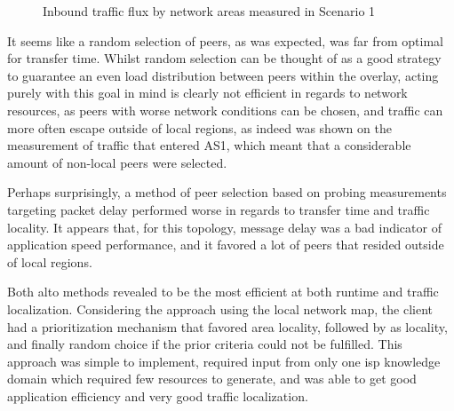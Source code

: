 \begin{figure}[H]
\caption{Inbound traffic flux by network areas measured in Scenario 1}
\label{fig:graph-traffic-scenario1}
\end{figure}

    It seems like a random selection of peers, as was expected, was far from optimal for transfer time. 
    Whilst random selection can be thought of as a good strategy to guarantee an even load distribution between peers within the overlay, acting purely with this goal in mind is clearly not efficient in regards to network resources, as peers with worse network conditions can be chosen, and traffic can more often escape outside of local regions, as indeed was shown on the measurement of traffic that entered AS1, which meant that a considerable amount of non-local peers were selected. 

    Perhaps surprisingly, a method of peer selection based on probing measurements targeting packet delay performed worse in regards to transfer time and traffic locality.
    It appears that, for this topology, message delay was a bad indicator of application speed performance, and it favored a lot of peers that resided outside of local regions.

    Both \gls{alto} methods revealed to be the most efficient at both runtime and traffic localization.
    Considering the approach using the local network map, the client had a prioritization mechanism that favored area locality, followed by \gls{as} locality, and finally random choice if the prior criteria could not be fulfilled.
    This approach was simple to implement, required input from only one \gls{isp} knowledge domain which required few resources to generate, and was able to get good application efficiency and very good traffic localization.

